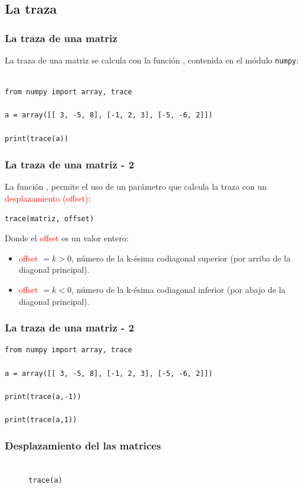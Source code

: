 \subsection{La traza}
\begin{frame}[fragile]
\frametitle{La traza de una matriz}
La traza de una matriz se calcula con la función , contenida en el módulo \texttt{numpy}:
\begin{lstlisting}[caption=Cálculo de la traza, style=FormattedNumber, basicstyle=\linespread{1.1}\ttfamily=\small, columns=fullflexible]

from numpy import array, trace

a = array([[ 3, -5, 8], [-1, 2, 3], [-5, -6, 2]])

print(trace(a))
\end{lstlisting}
\end{frame}
\begin{frame}[fragile]
\frametitle{La traza de una matriz - 2}
La función , permite el uso de un parámetro que calcula la traza con un \textcolor{red}{desplazamiento (offset)}:
\begin{verbatim}
trace(matriz, offset)
\end{verbatim}
Donde el \textcolor{red}{offset} es un valor entero:
\begin{itemize}
\item \textcolor{red}{offset} $= k > 0$, número de la k-ésima codiagonal superior (por arriba de la diagonal principal).
\item \textcolor{red}{offset} $= k < 0$, número de la k-ésima codiagonal inferior (por abajo de la diagonal principal).
\end{itemize}
\end{frame}
\begin{frame}
\frametitle{La traza de una matriz - 2}
\begin{lstlisting}[caption=Cálculo de la traza con desplazamiento, style=FormattedNumber, basicstyle=\linespread{1.1}\ttfamily=\small, columns=fullflexible]
from numpy import array, trace

a = array([[ 3, -5, 8], [-1, 2, 3], [-5, -6, 2]])

print(trace(a,-1))

print(trace(a,1))

\end{lstlisting}
\end{frame}
\begin{frame}
\frametitle{Desplazamiento del las matrices}
\begin{figure}
	\centering
	
 	\\ \texttt{trace(a)}
\end{figure}
\end{frame}
